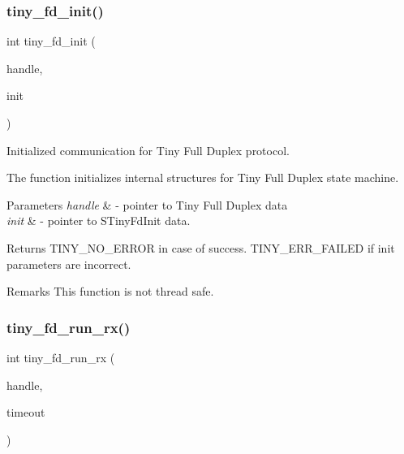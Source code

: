 \subsubsection{\texorpdfstring{tiny\+\_\+fd\+\_\+init()}{tiny\_fd\_init()}}
{\footnotesize\ttfamily int tiny\+\_\+fd\+\_\+init (\begin{DoxyParamCaption}\item[{\hyperlink{group__FULL__DUPLEX__API_ga91e6b79431fe38570fb102701ef0b7e8}{tiny\+\_\+fd\+\_\+handle\+\_\+t} $\ast$}]{handle,  }\item[{\hyperlink{group__FULL__DUPLEX__API_gac931714d7bbe299856f4533fd1edb7f6}{S\+Tiny\+Fd\+Init} $\ast$}]{init }\end{DoxyParamCaption})}



Initialized communication for Tiny Full Duplex protocol. 

The function initializes internal structures for Tiny Full Duplex state machine.


\begin{DoxyParams}{Parameters}
{\em handle} & -\/ pointer to Tiny Full Duplex data \\
\hline
{\em init} & -\/ pointer to S\+Tiny\+Fd\+Init data. \\
\hline
\end{DoxyParams}
\begin{DoxyReturn}{Returns}
T\+I\+N\+Y\+\_\+\+N\+O\+\_\+\+E\+R\+R\+OR in case of success. T\+I\+N\+Y\+\_\+\+E\+R\+R\+\_\+\+F\+A\+I\+L\+ED if init parameters are incorrect. 
\end{DoxyReturn}
\begin{DoxyRemark}{Remarks}
This function is not thread safe. 
\end{DoxyRemark}
\mbox{\label{group__FULL__DUPLEX__API_gad31f944514aef01e27bc3ec67fdbe140}} 
\subsubsection{\texorpdfstring{tiny\+\_\+fd\+\_\+run\+\_\+rx()}{tiny\_fd\_run\_rx()}}
{\footnotesize\ttfamily int tiny\+\_\+fd\+\_\+run\+\_\+rx (\begin{DoxyParamCaption}\item[{\hyperlink{group__FULL__DUPLEX__API_ga91e6b79431fe38570fb102701ef0b7e8}{tiny\+\_\+fd\+\_\+handle\+\_\+t}}]{handle,  }\item[{uint16\+\_\+t}]{timeout }\end{DoxyParamCaption})}



